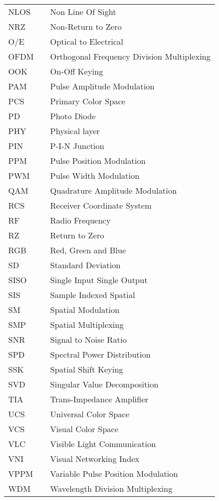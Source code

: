 \begin{center}
\begin{longtable}{lll}
		NLOS & \dotfill & Non Line Of Sight \\
		NRZ & \dotfill & Non-Return to Zero \\
		O/E & \dotfill & Optical to Electrical \\
		OFDM  & \dotfill & Orthogonal Frequency Division Multiplexing \\
		OOK & \dotfill & On-Off Keying \\
		PAM & \dotfill & Pulse Amplitude Modulation \\
		PCS & \dotfill & Primary Color Space \\
		PD & \dotfill & Photo Diode \\
		PHY & \dotfill & Physical layer \\
		PIN & \dotfill & P-I-N Junction \\
		PPM & \dotfill & Pulse Position Modulation \\
		PWM & \dotfill & Pulse Width Modulation \\
		QAM & \dotfill & Quadrature Amplitude Modulation \\
		RCS & \dotfill & Receiver Coordinate System \\
    RF  & \dotfill & Radio Frequency \\
		RZ & \dotfill & Return to Zero \\
		RGB & \dotfill & Red, Green and Blue \\
		SD & \dotfill & Standard Deviation \\
		SISO & \dotfill & Single Input Single Output \\
		SIS & \dotfill & Sample Indexed Spatial \\
		SM & \dotfill & Spatial Modulation \\
		SMP & \dotfill & Spatial Multiplexing \\
		SNR & \dotfill & Signal to Noise Ratio \\
		SPD & \dotfill & Spectral Power Distribution \\
		SSK & \dotfill & Spatial Shift Keying \\
		SVD & \dotfill & Singular Value Decomposition \\
		TIA & \dotfill & Trans-Impedance Amplifier \\
		UCS & \dotfill & Universal Color Space \\
		VCS & \dotfill & Visual Color Space \\
    VLC  & \dotfill & Visible Light Communication \\
		VNI & \dotfill & Visual Networking Index \\
		VPPM & \dotfill & Variable Pulse Position Modulation \\
		WDM & \dotfill & Wavelength Division Multiplexing \\
  \end{longtable}
\end{center}